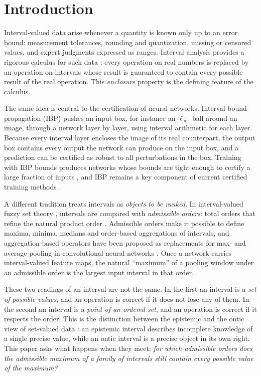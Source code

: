 \documentclass[preprint,12pt]{elsarticle}
\theoremstyle{definition}
\begin{document}
\section{Introduction}
\label{sec:intro}

Interval-valued data arise whenever a quantity is known only up to an error bound: measurement tolerances, rounding and quantization, missing or censored values, and expert judgments expressed as ranges. Interval analysis provides a rigorous calculus for such data \cite{moore2009,rump1999}: every operation on real numbers is replaced by an operation on intervals whose result is guaranteed to contain every possible result of the real operation. This \emph{enclosure} property is the defining feature of the calculus.

The same idea is central to the certification of neural networks. Interval bound propagation (IBP) \cite{mirman2018,gowal2018} pushes an input box, for instance an $\ell_\infty$ ball around an image, through a network layer by layer, using interval arithmetic for each layer. Because every interval layer encloses the image of its real counterpart, the output box contains every output the network can produce on the input box, and a prediction can be certified as robust to all perturbations in the box. Training with IBP bounds produces networks whose bounds are tight enough to certify a large fraction of inputs \cite{gowal2018,zhang2020crownibp,shi2021,mao2024}, and IBP remains a key component of current certified training methods \cite{muller2023sabr,depalma2024,mao2024ctbench}.

A different tradition treats intervals as \emph{objects to be ranked}. In interval-valued fuzzy set theory \cite{zadeh1975}, intervals are compared with \emph{admissible orders}: total orders that refine the natural product order \cite{bustince2013orders,bustince2013choquet}. Admissible orders make it possible to define maxima, minima, medians and order-based aggregations of intervals, and aggregation-based operators have been proposed as replacements for max- and average-pooling in convolutional neural networks \cite{rodriguez2022,rodriguez2023,forcen2020}. Once a network carries interval-valued feature maps, the natural ``maximum'' of a pooling window under an admissible order is the largest input interval in that order.

These two readings of an interval are not the same. In the first an interval is a \emph{set of possible values}, and an operation is correct if it does not lose any of them. In the second an interval is a \emph{point of an ordered set}, and an operation is correct if it respects the order. This is the distinction between the epistemic and the ontic view of set-valued data \cite{couso2014}: an epistemic interval describes incomplete knowledge of a single precise value, while an ontic interval is a precise object in its own right. This paper asks what happens when they meet: \emph{for which admissible orders does the admissible maximum of a family of intervals still contain every possible value of the maximum?}
\end{document}
